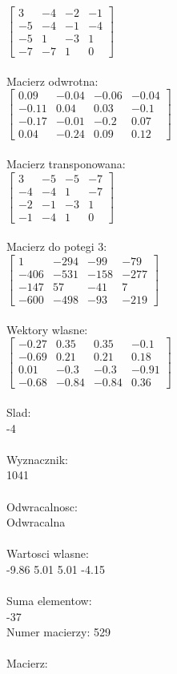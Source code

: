 \documentclass[a4paper,12pt]{article}
\begin{document}
$\begin{bmatrix} 3&-4&-2&-1\\-5&-4&-1&-4\\-5&1&-3&1\\-7&-7&1&0 \end{bmatrix}$
\\
\\
Macierz odwrotna:\\

$\begin{bmatrix} 0.09&-0.04&-0.06&-0.04\\-0.11&0.04&0.03&-0.1\\-0.17&-0.01&-0.2&0.07\\0.04&-0.24&0.09&0.12 \end{bmatrix}$
\\
\\
Macierz transponowana:\\

$\begin{bmatrix} 3&-5&-5&-7\\-4&-4&1&-7\\-2&-1&-3&1\\-1&-4&1&0 \end{bmatrix}$
\\
\\
Macierz do potegi 3:\\

$\begin{bmatrix} 1&-294&-99&-79\\-406&-531&-158&-277\\-147&57&-41&7\\-600&-498&-93&-219 \end{bmatrix}$
\\
\\
Wektory wlasne:\\

$\begin{bmatrix} -0.27&0.35&0.35&-0.1\\-0.69&0.21&0.21&0.18\\0.01&-0.3&-0.3&-0.91\\-0.68&-0.84&-0.84&0.36 \end{bmatrix}$
\\
\\
Slad:\\
-4
\\
\\
Wyznacznik:\\
1041
\\
\\
Odwracalnosc:\\
Odwracalna
\\
\\
Wartosci wlasne:\\
-9.86 5.01 5.01 -4.15
\\
\\
Suma elementow:\\
-37
\\
\newpage
Numer macierzy:
529
\\
\\
Macierz:\\
\end{document}
